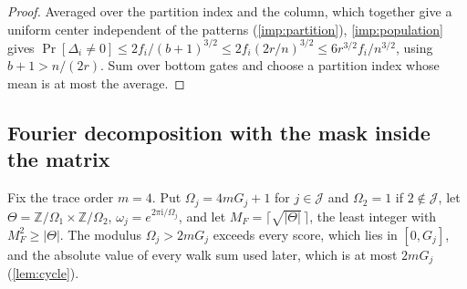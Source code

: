 \documentclass[11pt,letterpaper]{article}
\theoremstyle{definition}
\theoremstyle{remark}
\newcommand{\Z}{\mathbb Z}
\newcommand{\cJ}{\mathcal J}
\newcommand{\iu}{\mathrm i}
\begin{document}
\begin{proof}
Averaged over the partition index and the column, which together give
a uniform center independent of the patterns (\cref{imp:partition}),
\cref{imp:population} gives
\(\Pr[\Delta_i\ne0]\le2f_i/(b+1)^{3/2}\le2f_i(2r/n)^{3/2}\le6r^{3/2}f_i/n^{3/2}\),
using \(b+1>n/(2r)\). Sum over bottom gates and choose a partition index
whose mean is at most the average.
\end{proof}

\subsection{Fourier decomposition with the mask inside the matrix}\label{sec:fourier}

Fix the trace order \(m=4\). Put \(\Omega_j=4mG_j+1\) for
\(j\in\cJ\) and \(\Omega_2=1\) if \(2\notin\cJ\), let
\(\Theta=\Z/\Omega_1\times\Z/\Omega_2\),
\(\omega_j=e^{2\pi\iu/\Omega_j}\), and let \(M_F=\lceil\sqrt{|\Theta|}\,\rceil\), the least integer with \(M_F^2\ge|\Theta|\). The
modulus \(\Omega_j>2mG_j\) exceeds every score, which lies in
\([0,G_j]\), and the absolute value of every walk sum used later,
which is at most \(2mG_j\) (\cref{lem:cycle}).
\end{document}
